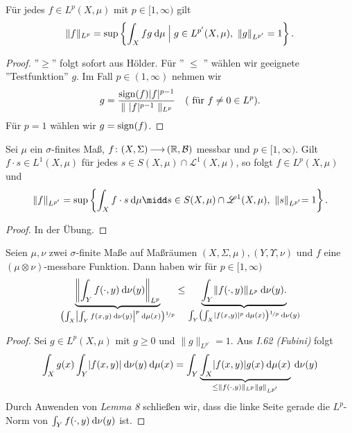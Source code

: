 \documentclass[skript.tex]{subfiles}
\begin{document}
\begin{cor}
	Für jedes $f \in L^p (X,\mu)$ mit $p \in [1, \infty)$ gilt
	\[
		\lVert f \rVert_{L^p} = \sup \left\{\int_X fg \: \mathrm{d} \mu \mathrel{\Big|}  g \in L^{p'} (X,\mu),\ \lVert g \rVert_{L^{p'} }= 1\right\}.
	\]
\end{cor}

\begin{proof}
	''$\geq$'' folgt sofort aus Hölder. Für '' $\leq$ '' wählen wir geeignete ''Testfunktion'' $g$. Im Fall $p \in (1, \infty)$ nehmen wir
	\[
		g = \frac{\operatorname{sign}(f) \lvert f \rvert^{p-1}}{\lVert\ \lvert f \rvert^{p-1}\ \rVert_{L^p}} \quad (\text{ für } f \neq 0 \in L^p).
	\]
	Für $p=1$ wählen wir $g = \operatorname{sign} (f)$.
\end{proof}

\begin{lem}
	Sei $\mu$ ein $\sigma$-finites Maß, $f\colon (X,\Sigma) \kern -1pt \longrightarrow \kern -1pt (\mathbb{R}, \mathcal{B})$ messbar und $p\in [1, \infty)$. Gilt \\$f\cdot s \in L^1(X,\mu)$ für jedes $s \in S(X,\mu) \cap \mathscr{L}^1(X,\mu)$, so folgt $f \in L^p(X,\mu)$ und 
	\[
		\lVert f \rVert_{L^{p'}} = \sup \cbr{\int_X f\cdot s \md \mu \midd s \in S(X,\mu) \cap \mathscr{L}^1(X,\mu),\ \rVert s \lVert_{L^{p'}} =1}.
	\]
\end{lem}

\begin{proof}
	In der Übung.
\end{proof}

\begin{theorem}[Minkowski]
	Seien $\mu, \nu$ zwei $\sigma$-finite Maße auf Maßräumen $(X, \Sigma, \mu), (Y, \Upsilon, \nu)$ und $f$ eine $(\mu \otimes \nu)$-messbare Funktion. Dann haben wir für $p\in [1, \infty)$
	\[
		\underbrace{\left\Vert \int_Y f(\cdot, y) \md \nu(y) \right\Vert_{L^p}}_{\pr{\int_X \left\vert \int_Y f(x,y) \md \nu(y) \right\vert^p \md \mu(x)}^{\nicefrac{1}{p}}} \leq \underbrace{ \int_Y \lVert f(\cdot, y) \rVert_{L^p} \md \nu(y).}_{\int_Y\pr{\int_X \lvert f(x,y) \rvert^p \md \mu(x)}^{\nicefrac{1}{p}} \md \nu(y)}
	\]
\end{theorem}

\begin{proof}
	Sei $g \in L^p(X,\mu)$ mit $g \geq 0$ und $\lVert g \rVert_{L^{p'}} =1$. Aus \textit{I.62 (Fubini)} folgt 
	\[
		\int_X g(x) \int_Y \lvert f(x,y) \rvert \: \mathrm{d} \nu(y) \: \mathrm{d} \mu(x) = \int_Y \underbrace{\int_X \lvert f(x,y)\rvert g(x) \: \mathrm{d} \mu(x)}_{\leq \lVert f(\cdot, y) \rVert_{L^{p}} \lVert g \rVert_{L^{p'}}} \: \mathrm{d} \nu(y)
	\]
	Durch Anwenden von \textit{Lemma 8} schließen wir, dass die linke Seite gerade die $L^p$-Norm von $\int_Y f(\cdot, y) \: \mathrm{d} \nu(y)$ ist.
\end{proof}
\end{document}
